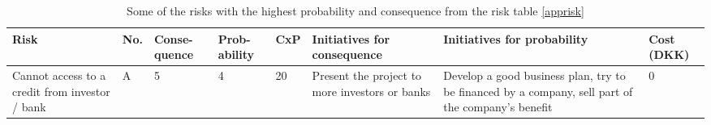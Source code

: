 \def\arraystretch{1.7}
\begin{table}[h!]
\label{riskshort}
\centering
\scriptsize
\begin{tabular}{|p{3cm} |p{0.3cm} |p{0.9cm} |p{0.9cm} |p{0.5cm} |p{3cm} |p{3cm} |p{0.7cm}|}
\hline
Risk 	&	No.	& Conse- \newline quence	& Prob-\newline  ability	& CxP	& Initiatives \newline for consequence	& Initiatives \newline for probability	& Cost \newline (DKK) \\
\hline
Cannot access to a credit from investor / bank					& A	& 5				&	4			& 20	& Present the project to more investors or banks	& Develop a good business plan, try to be financed by a company, sell part of the company's benefit	& 0\\
\hline
\end{tabular}
\caption{Some of the risks with the highest probability and consequence from the risk table \ref{apprisk}}
\end{table}
\def\arraystretch{1}
